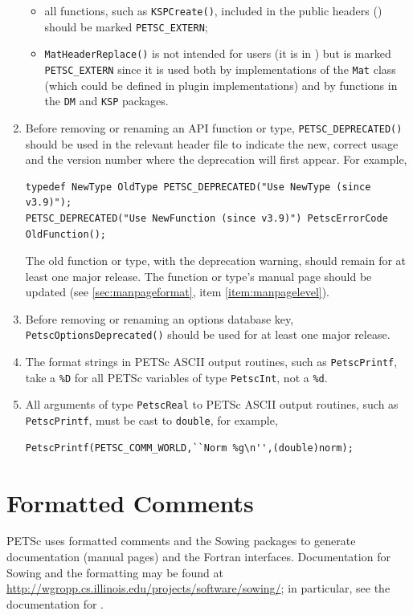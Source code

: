 \begin{enumerate}
\begin{itemize}
\item all functions, such as \lstinline{KSPCreate()}, included in the public headers () should be marked \lstinline{PETSC_EXTERN};
\item \lstinline{MatHeaderReplace()} is not intended for users (it is in ) but is marked \lstinline{PETSC_EXTERN} since it is used both by implementations of the \lstinline{Mat} class (which could be defined in plugin implementations) and by functions in the \lstinline{DM} and \lstinline{KSP} packages.
\end{itemize}
\item Before removing or renaming an API function or type, \lstinline{PETSC_DEPRECATED()} should be used in the relevant header file to indicate the new, correct usage and the version number where the deprecation will first appear. For example,
\begin{lstlisting}
typedef NewType OldType PETSC_DEPRECATED("Use NewType (since v3.9)");
PETSC_DEPRECATED("Use NewFunction (since v3.9)") PetscErrorCode OldFunction();
\end{lstlisting}
The old function or type, with the deprecation warning, should remain for at least one major release. The function or type's manual page should be updated (see \ref{sec:manpageformat}, item \ref{item:manpagelevel}).
\item Before removing or renaming an options database key, \lstinline{PetscOptionsDeprecated()} should be used for at least one major release.
\item The format strings in PETSc ASCII output routines, such as \lstinline{PetscPrintf}, take a \lstinline{%D} for all PETSc variables of
    type \lstinline{PetscInt}, not a \lstinline{%d}.
\item All arguments of type \lstinline{PetscReal} to PETSc ASCII output routines, such as \lstinline{PetscPrintf}, must be cast to \lstinline{double}, for example,
\begin{lstlisting}
PetscPrintf(PETSC_COMM_WORLD,``Norm %g\n'',(double)norm);
\end{lstlisting}
\end{enumerate}

\section{Formatted Comments}

PETSc uses formatted comments and the Sowing packages \cite{gropp1993sowing,gropp1993sowing2} to generate documentation (manual pages) and the Fortran interfaces.
Documentation for Sowing and the formatting may be found at \href{http://wgropp.cs.illinois.edu/projects/software/sowing/}{http://wgropp.cs.illinois.edu/projects/software/sowing/}; in particular, see the documentation for .

